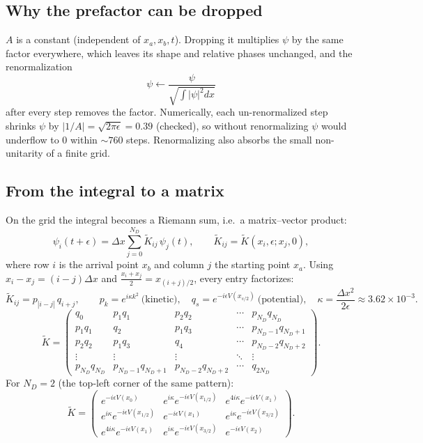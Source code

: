 \documentclass[10pt]{article}
\begin{document}
\subsection{Why the prefactor can be dropped}
$A$ is a constant (independent of $x_a,x_b,t$). Dropping it multiplies $\psi$ by the same factor everywhere, which leaves its shape and relative phases unchanged, and the renormalization
\[
\psi\leftarrow\frac{\psi}{\sqrt{\int|\psi|^2dx}}
\]
after every step removes the factor. Numerically, each un-renormalized step shrinks $\psi$ by $|1/A|=\sqrt{2\pi\epsilon}=0.39$ (checked), so without renormalizing $\psi$ would underflow to $0$ within $\sim760$ steps. Renormalizing also absorbs the small non-unitarity of a finite grid.

\subsection{From the integral to a matrix}
On the grid the integral becomes a Riemann sum, i.e.\ a matrix--vector product:
\[
\psi_i(t+\epsilon)=\Delta x\sum_{j=0}^{N_D}\tilde K_{ij}\,\psi_j(t),\qquad\tilde K_{ij}=\tilde K(x_i,\epsilon;x_j,0),
\]
where row $i$ is the arrival point $x_b$ and column $j$ the starting point $x_a$. Using $x_i-x_j=(i-j)\Delta x$ and $\frac{x_i+x_j}2=x_{(i+j)/2}$, every entry factorizes:
\[
\tilde K_{ij}=p_{|i-j|}\,q_{i+j},\qquad p_k=e^{i\kappa k^2}\ \text{(kinetic)},\quad q_s=e^{-i\epsilon V(x_{s/2})}\ \text{(potential)},\quad\kappa=\frac{\Delta x^2}{2\epsilon}\approx3.62\times10^{-3}.
\]
\[
\tilde K=
\begin{pmatrix}
q_0 & p_1q_1 & p_2q_2 & \cdots & p_{N_D}q_{N_D}\\
p_1q_1 & q_2 & p_1q_3 & \cdots & p_{N_D-1}q_{N_D+1}\\
p_2q_2 & p_1q_3 & q_4 & \cdots & p_{N_D-2}q_{N_D+2}\\
\vdots & \vdots & \vdots & \ddots & \vdots\\
p_{N_D}q_{N_D} & p_{N_D-1}q_{N_D+1} & p_{N_D-2}q_{N_D+2} & \cdots & q_{2N_D}
\end{pmatrix}.
\]
For $N_D=2$ (the top-left corner of the same pattern):
\[
\tilde K=\begin{pmatrix}
e^{-i\epsilon V(x_0)} & e^{i\kappa}e^{-i\epsilon V(x_{1/2})} & e^{4i\kappa}e^{-i\epsilon V(x_1)}\\
e^{i\kappa}e^{-i\epsilon V(x_{1/2})} & e^{-i\epsilon V(x_1)} & e^{i\kappa}e^{-i\epsilon V(x_{3/2})}\\
e^{4i\kappa}e^{-i\epsilon V(x_1)} & e^{i\kappa}e^{-i\epsilon V(x_{3/2})} & e^{-i\epsilon V(x_2)}
\end{pmatrix}.
\]
\end{document}
